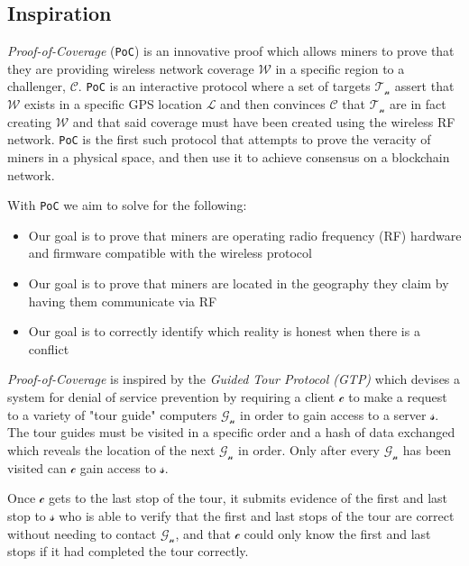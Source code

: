 \documentclass[letterpaper,11pt]{article}
\def\coverage/{$\mathcal{W}$}
\def\location/{$\mathcal{L}$}
\def\proofofcoverage/{\textit{Proof-of-Coverage}}
\begin{document}
\subsection{Inspiration}

\proofofcoverage/ (\verb|PoC|) is an innovative proof which allows miners to prove that they are providing wireless network coverage \coverage/ in a specific region to a challenger, $\mathcal{C}$. \verb|PoC| is an interactive protocol where a set of targets $\mathcal{T_n}$ assert that \coverage/ exists in a specific GPS location \location/ and then convinces $\mathcal{C}$ that $\mathcal{T_n}$ are in fact creating \coverage/ and that said coverage must have been created using the wireless RF network. \verb|PoC| is the first such protocol that attempts to prove the veracity of miners in a physical space, and then use it to achieve consensus on a blockchain network.\newline

With \verb|PoC| we aim to solve for the following:

\begin{itemize}
	\item Our goal is to prove that miners are operating radio frequency (RF) hardware and firmware compatible with the wireless protocol
	\item Our goal is to prove that miners are located in the geography they claim by having them communicate via RF
	\item Our goal is to correctly identify which reality is honest when there is a conflict
\end{itemize}

\proofofcoverage/ is inspired by the \textit{Guided Tour Protocol (GTP)} which devises a system for denial of service prevention by requiring a client $\mathcal{c}$ to make a request to a variety of "tour guide" computers $\mathcal{G_n}$ in order to gain access to a server $\mathcal{s}$. The tour guides must be visited in a specific order and a hash of data exchanged which reveals the location of the next $\mathcal{G_n}$ in order. Only after every $\mathcal{G_n}$ has been visited can $\mathcal{c}$ gain access to $\mathcal{s}$.\newline

Once $\mathcal{c}$ gets to the last stop of the tour, it submits evidence of the first and last stop to $\mathcal{s}$ who is able to verify that the first and last stops of the tour are correct without needing to contact $\mathcal{G_n}$, and that $\mathcal{c}$ could only know the first and last stops if it had completed the tour correctly.\newline
\end{document}
